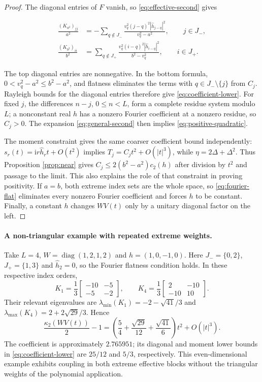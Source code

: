 \documentclass[10pt,twoside,final]{siamart1116}
\numberwithin{equation}{section}
\numberwithin{theorem}{section}
\newcommand{\diag}{\operatorname{diag}}
\newcommand{\cond}{\kappa_2}
\newcommand{\ii}{\mathrm i}
\begin{document}
\begin{proof}
The diagonal entries of $F$ vanish, so \eqref{eq:effective-second} gives

\begin{align*}
\frac{(K_{a^2})_{jj}}{a^2}
&=-\sum_{q\notin J_-}\frac{v_q^2(j-q)^2|\widehat h_{j-q}|^2}{v_q^2-a^2},\qquad j\in J_-,\\
\frac{(K_{b^2})_{ii}}{b^2}
&=\sum_{q\notin J_+}\frac{v_q^2(i-q)^2|\widehat h_{i-q}|^2}{b^2-v_q^2},\qquad i\in J_+.
\end{align*}

The top diagonal entries are nonnegative. In the bottom formula,
$0<v_q^2-a^2\le b^2-a^2$, and flatness eliminates the terms with
$q\in J_-\setminus\{j\}$ from $C_j$. Rayleigh bounds for the diagonal entries
therefore give \eqref{eq:coefficient-lower}. For fixed $j$, the differences
$n-j$, $0\le n<L$, form a complete residue system modulo $L$; a nonconstant
real $h$ has a nonzero Fourier coefficient at a nonzero residue, so $C_j>0$.
The expansion \eqref{eq:general-second} then implies \eqref{eq:positive-quadratic}.

The moment constraint gives the same coarser coefficient bound independently:
$s_r(t)=\ii r\widehat h_rt+O(t^2)$ implies $T_j=C_jt^2+O(|t|^3)$, while
$\eta=2\Delta+\Delta^2$. Thus Proposition \ref{prop:near} gives
$C_j\le2(b^2-a^2)c_2(h)$ after division by $t^2$ and passage to the limit.
This also explains the role of that constraint in proving positivity.
If $a=b$, both extreme index sets are the whole space, so
\eqref{eq:fourier-flat} eliminates every nonzero Fourier coefficient and forces
$h$ to be constant. Finally, a constant $h$ changes $WV(t)$ only by a unitary
diagonal factor on the left.
\end{proof}


\paragraph{A non-triangular example with repeated extreme weights.}
Take $L=4$, $W=\diag(1,2,1,2)$ and $h=(1,0,-1,0)$.
Here $J_-=\{0,2\}$, $J_+=\{1,3\}$ and $\widehat h_2=0$, so the
Fourier flatness condition holds. In these respective index orders,
\[
K_1=\frac13\begin{bmatrix}-10&-5\\-5&-2\end{bmatrix},\qquad
K_4=\frac13\begin{bmatrix}2&-10\\-10&10\end{bmatrix}.
\]
Their relevant eigenvalues are $\lambda_{\min}(K_1)=-2-\sqrt{41}/3$ and
$\lambda_{\max}(K_4)=2+2\sqrt{29}/3$. Hence
\[
\frac{\cond(WV(t))}{2}-1=
\left(\frac54+\frac{\sqrt{29}}{12}+\frac{\sqrt{41}}6\right)t^2+O(|t|^3).
\]
The coefficient is approximately $2.765951$; its diagonal and moment lower
bounds in \eqref{eq:coefficient-lower} are $25/12$ and $5/3$, respectively.
This even-dimensional example exhibits coupling in both extreme effective
blocks without the triangular weights of the polynomial application.
\end{document}
